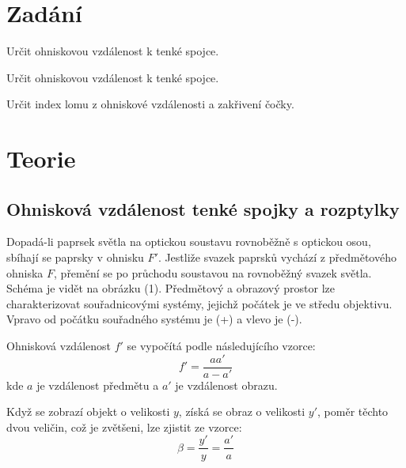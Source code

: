 \documentclass[a4paper,11pt]{article}
\begin{document}
\vskip1cm
    \begin{minipage}[t]{0.5\textwidth} 
        \section{Zadání}
            Určit ohniskovou vzdálenost k tenké spojce. 
            \par Určit ohniskovou vzdálenost k tenké spojce.
            \par Určit index lomu z ohniskové vzdálenosti a zakřivení čočky.
        \section{Teorie}
            \subsection{Ohnisková vzdálenost tenké spojky a rozptylky}
                Dopadá-li paprsek světla na optickou soustavu rovnoběžně s optickou osou, sbíhají se paprsky v ohnisku $F'$. Jestliže svazek paprsků vychází z předmětového ohniska $F$, přemění se po průchodu soustavou na rovnoběžný svazek světla. Schéma je vidět na obrázku (1). Předmětový a obrazový prostor lze charakterizovat souřadnicovými systémy, jejichž počátek je ve středu objektivu. Vpravo od počátku souřadného systému je (+) a vlevo je (-).
                \par Ohnisková vzdálenost $f'$ se vypočítá podle následujícího vzorce: 
                \begin{equation}
                    f' = \frac{aa'}{a-a'}
                \end{equation}
                kde $a$ je vzdálenost předmětu a $a'$ je vzdálenost obrazu.
                \par Když se zobrazí objekt o velikosti $y$, získá se obraz o velikosti $y'$, poměr těchto dvou veličin, což je zvětšeni, lze zjistit ze vzorce: 
                \begin{equation}
                    \beta = \frac{y'}{y} = \frac{a'}{a}
                \end{equation}
    \end{minipage}
    \hspace{10pt}
\end{document}
